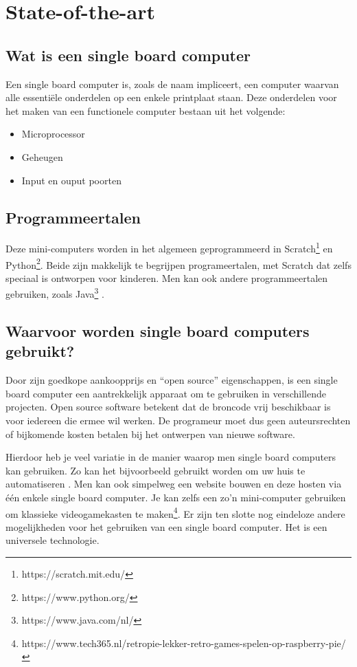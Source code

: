 
\section{State-of-the-art}
\label{sec:state-of-the-art}
\subsection{Wat is een single board computer}
Een single board computer is, zoals de naam impliceert, een computer waarvan alle essentiële onderdelen op een enkele printplaat staan.
Deze onderdelen voor het maken van een functionele computer bestaan uit het volgende:
\begin{itemize}
    \item Microprocessor
    \item Geheugen
    \item Input en ouput poorten
\end{itemize}

\subsection{Programmeertalen}
Deze mini-computers worden in het algemeen geprogrammeerd in Scratch\footnote{https://scratch.mit.edu/} en Python\footnote{https://www.python.org/}. Beide zijn makkelijk te begrijpen programeertalen, met Scratch dat zelfs speciaal is ontworpen voor kinderen. Men kan  ook andere programmeertalen gebruiken, zoals Java\footnote{https://www.java.com/nl/}
\autocite{Koelling2016}. 

\subsection{Waarvoor worden single board computers gebruikt?}
Door zijn goedkope aankoopprijs en “open source” eigenschappen, is een single board computer een aantrekkelijk apparaat om te gebruiken in verschillende projecten. Open source software betekent dat de broncode vrij beschikbaar is voor iedereen die ermee wil werken. De programeur moet dus geen auteursrechten of bijkomende kosten betalen bij het ontwerpen van nieuwe software. 

Hierdoor heb je veel variatie in de manier waarop men single board computers kan gebruiken. Zo kan het bijvoorbeeld gebruikt worden om uw huis te automatiseren \autocite{Jain2014}. Men kan ook simpelweg een website bouwen en deze hosten via één enkele single board computer. Je kan zelfs een zo'n mini-computer gebruiken om klassieke videogamekasten te maken\footnote{https://www.tech365.nl/retropie-lekker-retro-games-spelen-op-raspberry-pie/}. Er zijn ten slotte nog eindeloze andere mogelijkheden voor het gebruiken van een single board computer. Het is een universele technologie.

